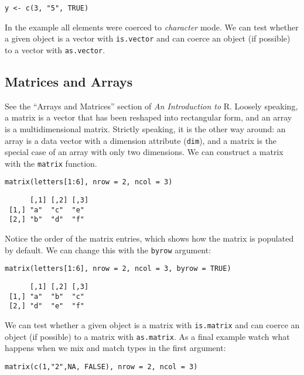 \documentclass[captions=tableheading]{scrbook}
\begin{document}
\begin{verbatim}
y <- c(3, "5", TRUE)
\end{verbatim}


In the example all elements were coerced to \emph{character} mode. We can test whether a given object is a vector with \texttt{is.vector} and can coerce an object (if possible) to a vector with \texttt{as.vector}.
\subsection{Matrices and Arrays}
\label{sec-5-1-2}


See the ``Arrays and Matrices'' section of \emph{An Introduction to} \textsf{R}. Loosely speaking, a matrix is a vector that has been reshaped into rectangular form, and an array is a multidimensional matrix. Strictly speaking, it is the other way around: an array is a data vector with a dimension attribute (\texttt{dim}), and a matrix is the special case of an array with only two dimensions. We can construct a matrix with the \texttt{matrix} function. 


\begin{verbatim}
matrix(letters[1:6], nrow = 2, ncol = 3)
\end{verbatim}

\begin{verbatim}
      [,1] [,2] [,3]
 [1,] "a"  "c"  "e" 
 [2,] "b"  "d"  "f"
\end{verbatim}

Notice the order of the matrix entries, which shows how the matrix is populated by default. We can change this with the \texttt{byrow} argument:


\begin{verbatim}
matrix(letters[1:6], nrow = 2, ncol = 3, byrow = TRUE)
\end{verbatim}

\begin{verbatim}
      [,1] [,2] [,3]
 [1,] "a"  "b"  "c" 
 [2,] "d"  "e"  "f"
\end{verbatim}

We can test whether a given object is a matrix with \texttt{is.matrix} and can coerce an object (if possible) to a matrix with \texttt{as.matrix}. As a final example watch what happens when we mix and match types in the first argument:


\begin{verbatim}
matrix(c(1,"2",NA, FALSE), nrow = 2, ncol = 3)
\end{verbatim}
\end{document}
